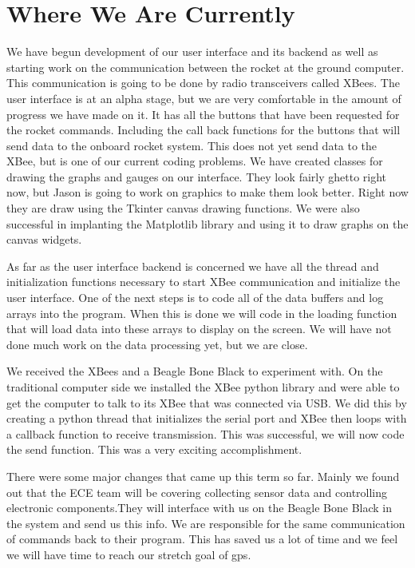 \documentclass[10pt,draftclsnofoot,onecolumn]{IEEEtran}
\begin{document}
\section{Where We Are Currently}
We have begun development of our user interface and its backend as well as starting work on the communication between the rocket at the ground computer. This communication is going to be done by radio transceivers called XBees. The user interface is at an alpha stage, but we are very comfortable in the amount of progress we have made on it. It has all the buttons that have been requested for the rocket commands. Including the call back functions for the buttons that will send data to the onboard rocket system. This does not yet send data to the XBee, but is one of our current coding problems. We have created classes for drawing the graphs and gauges on our interface. They look fairly ghetto right now, but Jason is going to work on graphics to make them look better. Right now they are draw using the Tkinter canvas drawing functions. We were also successful in implanting the Matplotlib library and using it to draw graphs on the canvas widgets.\par
As far as the user interface backend is concerned we have all the thread and initialization functions necessary to start XBee communication and initialize the user interface. One of the next steps is to code all of the data buffers and log arrays into the program. When this is done we will code in the loading function that will load data into these arrays to display on the screen. We will have not done much work on the data processing yet, but we are close. \par
We received the XBees and a Beagle Bone Black to experiment with. On the traditional computer side we installed the XBee python library and were able to get the computer to talk to its XBee that was connected via USB. We did this by creating a python thread that initializes the serial port and XBee then loops with a callback function to receive transmission. This was successful, we will now code the send function. This was a very exciting accomplishment.\par
There were some major changes that came up this term so far. Mainly we found out that the ECE team will be covering collecting sensor data and controlling electronic components.They will interface with us on the Beagle Bone Black in the system and send us this info. We are responsible for the same communication of commands back to their program. This has saved us a lot of time and we feel we will have time to reach our stretch goal of gps.\par
\end{document}
